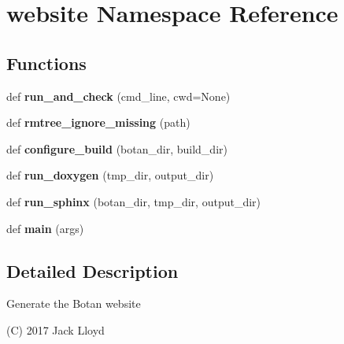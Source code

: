 \hypertarget{namespacewebsite}{}\section{website Namespace Reference}
\label{namespacewebsite}
\subsection*{Functions}
\begin{DoxyCompactItemize}
\item 
\mbox{\label{namespacewebsite_aa6cdeb62dc17ca3c8ebed1d72c5b15a0}} 
def {\bfseries run\+\_\+and\+\_\+check} (cmd\+\_\+line, cwd=None)
\item 
\mbox{\label{namespacewebsite_a1c25510195c4d70eedebd74a0f912adb}} 
def {\bfseries rmtree\+\_\+ignore\+\_\+missing} (path)
\item 
\mbox{\label{namespacewebsite_a21fd1d4fff378d1f68478b9aac9d04e2}} 
def {\bfseries configure\+\_\+build} (botan\+\_\+dir, build\+\_\+dir)
\item 
\mbox{\label{namespacewebsite_a8fec09b45410a3a947922bd64bf32b92}} 
def {\bfseries run\+\_\+doxygen} (tmp\+\_\+dir, output\+\_\+dir)
\item 
\mbox{\label{namespacewebsite_a012be59feb442ca022077736b3b1ef49}} 
def {\bfseries run\+\_\+sphinx} (botan\+\_\+dir, tmp\+\_\+dir, output\+\_\+dir)
\item 
\mbox{\label{namespacewebsite_a8353904271c759657cdd792069ed62aa}} 
def {\bfseries main} (args)
\end{DoxyCompactItemize}


\subsection{Detailed Description}
\begin{DoxyVerb}Generate the Botan website

(C) 2017 Jack Lloyd
\end{DoxyVerb}
 